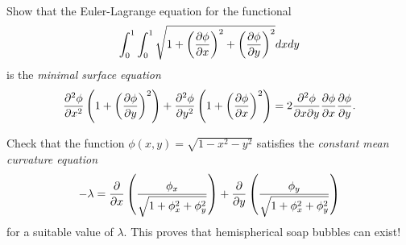 \documentclass[12pt]{article}
\begin{document}
\begin{question}\ \\
Show that the Euler-Lagrange equation for the functional
\[\int_0^1\int_0^1\sqrt{1+\left(\dfrac{\partial \phi}{\partial x}\right)^2+\left(\dfrac{\partial \phi}{\partial y}\right)^2}dxdy\]
is the {\em minimal surface equation}
\[\dfrac{\partial^2 \phi}{\partial x^2}\left(1+\left(\dfrac{\partial \phi}{\partial y}\right)^2\right)+\dfrac{\partial^2 \phi}{\partial y^2}\left(1+\left(\dfrac{\partial \phi}{\partial x}\right)^2\right)=2\dfrac{\partial^2 \phi}{\partial x\partial y}\dfrac{\partial \phi}{\partial x}\dfrac{\partial \phi}{\partial y}.\]
\end{question}

\iffalse
\begin{answer}
We will write $\phi_x$ for $\partial_x\phi$ and $j=\sqrt{1+\phi_x^2+\phi_y^2}$ for brevity. The Euler-Lagrange equation is
\[\frac{\partial}{\partial x}\frac{\phi_x}{j}+\frac{\partial}{\partial y}\frac{\phi_y}{j}=0\]
We have $\pd{}{x}\dfrac{\phi_x}{j}=\dfrac{\phi_{xx}}{j}-\dfrac{\phi_x}{j^2}\pd{j}{x}$ and $\pd{j}{x}=\dfrac{\phi_x\phi_{xx}+\phi_y\phi_{yx}}{j}$ (with a similar equation for the second term). Therefore the Euler-Lagrange equation implies
\[
0=\frac{\phi_{xx}+\phi_{yy}}{j}-\frac{1}{j^3}\left(\phi_x^2\phi_{xx}+2\phi_x\phi_y\phi_{xy}+\phi_y^2\phi_{yy}\right)
\]
or
\[0=\phi_{xx}(1+\phi_y^2)+\phi_{yy}(1+\phi_x^2)-2\phi_x\phi_y\phi_{xy}.\]
\end{answer}
\newpage
\fi

\bigskip

\begin{question}
Check that the function $\phi(x,y)=\sqrt{1-x^2-y^2}$ satisfies the {\em constant mean curvature equation}
\[-\lambda=\dfrac{\partial }{\partial x}\left(\frac{\phi_x}{\sqrt{1+\phi_x^2+\phi_y^2}}\right)+\dfrac{\partial }{\partial y}\left(\frac{\phi_y}{\sqrt{1+\phi_x^2+\phi_y^2}}\right)\]
for a suitable value of $\lambda$. This proves that hemispherical soap bubbles can exist!
\end{question}
\end{document}
